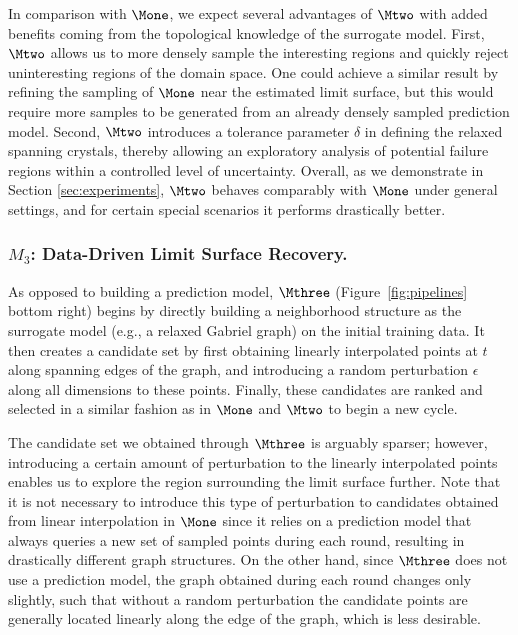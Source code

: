 In comparison with $\Mone$, we expect several advantages of $\Mtwo$ with added benefits coming from the topological knowledge of the surrogate model.
%
First, $\Mtwo$ allows us to more densely sample the interesting regions and quickly reject uninteresting regions of the domain space. One could achieve a similar result by refining the sampling of $\Mone$ near the estimated limit surface, but this would require more samples to be generated from an already densely sampled prediction model.
%
Second, $\Mtwo$ introduces a tolerance parameter $\delta$ in defining the relaxed spanning crystals, thereby allowing an exploratory analysis of potential failure regions within a controlled level of uncertainty.
%
Overall, as we demonstrate in Section \ref{sec:experiments}, $\Mtwo$ behaves comparably with $\Mone$ under general settings, and for certain special scenarios it performs drastically better.




\subsubsection{$M_3$: Data-Driven Limit Surface Recovery.}
As opposed to building a prediction model, $\Mthree$ (Figure~\ref{fig:pipelines} bottom right) begins by directly building a neighborhood structure as the surrogate model (e.g., a relaxed Gabriel graph) on the initial training data.
%
It then creates a candidate set by first obtaining linearly interpolated points at $t$ along spanning edges of the graph, and introducing a random perturbation $\epsilon$ along all dimensions to these points.
%
Finally, these candidates are ranked and selected in a similar fashion as in $\Mone$ and $\Mtwo$ to begin a new cycle.

The candidate set we obtained through $\Mthree$ is arguably sparser; however, introducing a certain amount of perturbation to the linearly interpolated points enables us to explore the region surrounding the limit surface further.
%
Note that it is not necessary to introduce this type of perturbation to candidates obtained from linear interpolation in $\Mone$ since it relies on a prediction model that always queries a new set of sampled points during each round, resulting in drastically different graph structures.
%
On the other hand, since $\Mthree$ does not use a prediction model, the graph obtained during each round changes only slightly, such that without a random perturbation the candidate points are generally located linearly along the edge of the graph, which is less desirable.



